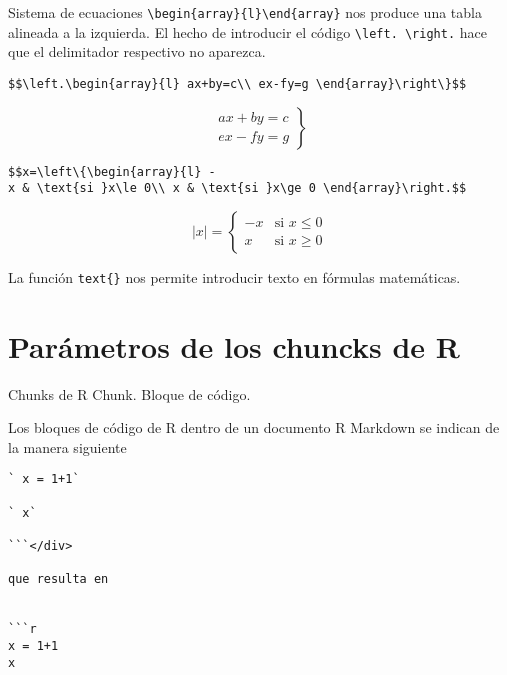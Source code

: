 \documentclass[
  ignorenonframetext,
]{beamer}
\begin{document}
\begin{frame}[fragile]{Sistema de ecuaciones}
\protect\hypertarget{sistema-de-ecuaciones}{}
\texttt{\textbackslash{}begin\{array\}\{l\}\textbackslash{}end\{array\}}
nos produce una tabla alineada a la izquierda. El hecho de introducir el
código \texttt{\textbackslash{}left.\ \textbackslash{}right.} hace que
el delimitador respectivo no aparezca.

\texttt{\$\$\textbackslash{}left.\textbackslash{}begin\{array\}\{l\}\ ax+by=c\textbackslash{}\textbackslash{}\ ex-fy=g\ \textbackslash{}end\{array\}\textbackslash{}right\textbackslash{}\}\$\$}

\[\left.\begin{array}{l}
ax+by=c\\
ex-fy=g
\end{array}\right\}\]

\texttt{\$\$\textbar{}x\textbar{}=\textbackslash{}left\textbackslash{}\{\textbackslash{}begin\{array\}\{l\}\ -x\ \&\ \textbackslash{}text\{si\ \}x\textbackslash{}le\ 0\textbackslash{}\textbackslash{}\ x\ \&\ \textbackslash{}text\{si\ \}x\textbackslash{}ge\ 0\ \textbackslash{}end\{array\}\textbackslash{}right.\$\$}

\[|x|=\left\{\begin{array}{l}
-x & \text{si }x\le 0\\
x & \text{si }x\ge 0
\end{array}\right.\]

La función \texttt{text\{\}} nos permite introducir texto en fórmulas
matemáticas.
\end{frame}

\hypertarget{paruxe1metros-de-los-chuncks-de-r}{%
\section{Parámetros de los chuncks de
R}\label{paruxe1metros-de-los-chuncks-de-r}}

\begin{frame}[fragile]{Chunks de R}
\protect\hypertarget{chunks-de-r}{}
Chunk. Bloque de código.

Los bloques de código de R dentro de un documento R Markdown se indican
de la manera siguiente

\begin{verbatim}
` x = 1+1`

` x`

```</div>

que resulta en


```r
x = 1+1
x
\end{verbatim}
\end{frame}
\end{document}
